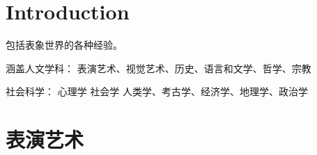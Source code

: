 

\chapter{Introduction}

包括表象世界的各种经验。

涵盖人文学科：
表演艺术、视觉艺术、历史、语言和文学、哲学、宗教



社会科学：
心理学
社会学
人类学、考古学、经济学、地理学、政治学




\chapter{表演艺术}

